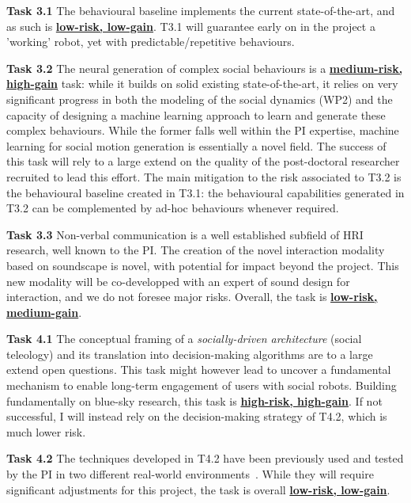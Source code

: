 \documentclass[11pt,a4paper]{report}
\begin{document}
\vspace{1em}

\textbf{Task 3.1} The behavioural baseline implements the current state-of-the-art,
and as such is \ul{\bf low-risk, low-gain}. T3.1 will guarantee early on in the
project a 'working' robot, yet with predictable/repetitive behaviours.

\textbf{Task 3.2} The neural generation of complex social behaviours is a
\ul{\bf medium-risk, high-gain} task: while it builds on solid existing
state-of-the-art, it relies on very significant progress in both the modeling of the
social dynamics (WP2) and the capacity of designing a machine learning approach
to learn and generate these complex behaviours. While the former falls well
within the PI expertise, machine learning for social motion generation is
essentially a novel field. The success of this task will rely to a large
extend on the quality of the post-doctoral researcher recruited to lead this
effort. The main mitigation to the risk associated to T3.2 is the behavioural
baseline created in T3.1: the behavioural capabilities generated in T3.2 can be
complemented by ad-hoc behaviours whenever required.

\textbf{Task 3.3} Non-verbal communication is a well established subfield of HRI
research, well known to the PI. The creation of the novel interaction modality
based on soundscape is novel, with potential for impact beyond the project. This
new modality will be co-developped with an expert of sound design for
interaction, and we do not foresee major risks. Overall, the task is \ul{\bf
low-risk, medium-gain}.

\vspace{1em}

\textbf{Task 4.1} The conceptual framing of a \emph{socially-driven
architecture} (social teleology) and its translation into decision-making
algorithms are to a large extend open questions. This task might however lead to
uncover a fundamental mechanism to enable long-term engagement of users
with social robots. Building fundamentally on blue-sky research, this task is
\ul{\bf high-risk, high-gain}. If not successful, I will instead rely on the
decision-making strategy of T4.2, which is much lower risk.

\textbf{Task 4.2} The techniques developed in T4.2 have been previously used and
tested by the PI in two different real-world
environments~\cite{senft2019teaching,winkle2020couch}. While they will require
significant adjustments for this project, the task is overall \ul{\bf low-risk,
low-gain}.
\end{document}
